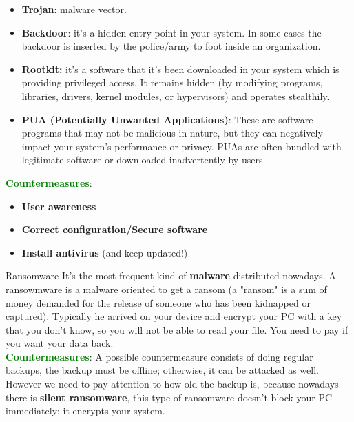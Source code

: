 \begin{itemize}
\begin{itemize}
    \item \textbf{Trojan}: malware vector.
    \item \textbf{Backdoor}: it's a hidden entry point in your system. In some cases the backdoor is inserted by the police/army to foot inside an organization.
    \item \textbf{Rootkit:} it's a software that it's been downloaded in your system which is providing privileged access. It remains hidden (by modifying programs, libraries, drivers, kernel modules, or hypervisors) and operates stealthily.
    \item \textbf{PUA (Potentially Unwanted Applications)}: These are software programs that may not be malicious in nature, but they can negatively impact your system's performance or privacy. PUAs are often bundled with legitimate software or downloaded inadvertently by users.
\end{itemize}
\noindent
\textcolor{green}{\textbf{Countermeasures}}: \begin{itemize}
    \item \textbf{User awareness}
    \item \textbf{Correct configuration/Secure software}
    \item \textbf{Install antivirus} (and keep updated!)
\end{itemize}
\begin{quotebox-grey}{Ransomware}
    It’s the most frequent kind of \textbf{malware} distributed nowadays. A ransowmware is a malware oriented to get a ransom (a "ransom" is a sum of money demanded for the release of someone who has been kidnapped or captured). Typically he arrived
    on your device and encrypt your PC with a key that you don’t know, so you will not be able to read your file. You need to pay if you want your data back.\\ 
    \textcolor{green}{\textbf{Countermeasures}}: A possible countermeasure consists of doing regular backups, the backup must be offline; otherwise, it can be attacked as well. However we need to pay attention to how old the backup is, because nowadays there is \textbf{silent ransomware}, this type of ransomware doesn't block your PC immediately; it encrypts your system.
\end{quotebox-grey}
\end{itemize}

